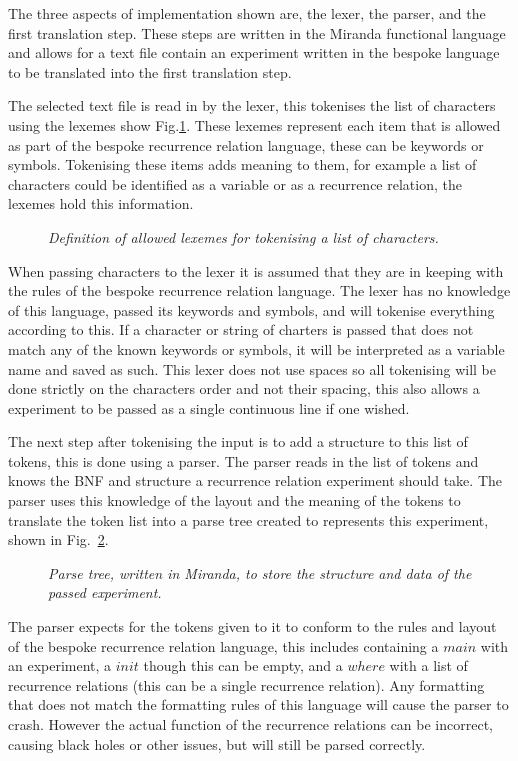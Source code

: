 \documentclass{article}
\begin{document}
The three aspects of implementation shown are, the lexer, the parser, and the first translation step. These steps are written in the Miranda functional language and allows for a text file contain an experiment written in the bespoke language to be translated into the first translation step. 

The selected text file is read in by the lexer, this tokenises the list of characters using the lexemes show Fig.\ref{fig:tokens}. These lexemes represent each item that is allowed as part of the bespoke recurrence relation language, these can be keywords or symbols. Tokenising these items adds meaning to them, for example a list of characters could be identified as a variable or as a recurrence relation, the lexemes hold this information. 
\begin{figure}[H]
	\centering
	
	\caption{\it Definition of allowed lexemes for tokenising a list of characters.}
	\label{fig:tokens}
\end{figure} 

When passing characters to the lexer it is assumed that they are in keeping with the rules of the bespoke recurrence relation language. The lexer has no knowledge of this language, passed its keywords and symbols, and will tokenise everything according to this. If a character or string of charters is passed that does not match any of the known keywords  or symbols, it will be interpreted as a variable name and saved as such. This lexer does not use spaces so all tokenising will be done strictly on the characters order and not their spacing, this also allows a experiment to be passed as a single continuous line if one wished. 

The next step after tokenising the input is to add a structure to this list of tokens, this is done using a parser. The parser reads in the list of tokens and knows the BNF and structure a recurrence relation experiment should take. The parser uses this knowledge of the layout and the meaning of the tokens to translate the token list into a parse tree created to represents this experiment, shown in Fig.~\ref{fig:parsetreecodemira}.  
\begin{figure}[H]
	\centering
	
	\caption{\it Parse tree, written in Miranda, to store the structure and data of the passed experiment.}
	\label{fig:parsetreecodemira}
\end{figure} 

The parser expects for the tokens given to it to conform to the rules and layout of the bespoke recurrence relation language, this includes containing a $main$ with an experiment, a $init$ though this can be empty, and a $where$ with a list of recurrence relations (this can be a single recurrence relation). Any formatting that does not match the formatting rules of this language will cause the parser to crash. However the actual function of the recurrence relations can be incorrect, causing black holes or other issues, but will still be parsed correctly.
\end{document}
